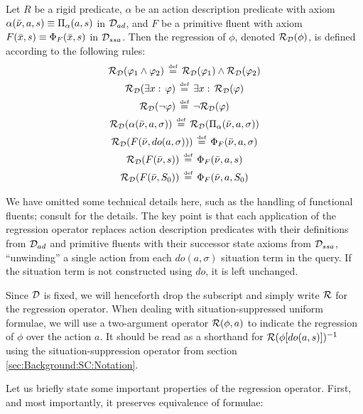 \begin{defnL}
 Let $R$ be a rigid predicate, $\alpha$
be an action description predicate with axiom $\alpha(\bar{\nu},a,s)\equiv\Pi_{\alpha}(a,s)$
in $\mathcal{D}_{ad}$, and $F$ be a primitive fluent with axiom $F(\bar{x},s)\equiv\Phi_{F}(\bar{x},s)$
in $\mathcal{D}_{ssa}$. Then the regression of $\phi$, denoted $\mathcal{R}_{\mathcal{D}}(\phi)$,
is defined according to the following rules:\begin{gather*}
\mathcal{R}_{\mathcal{D}}(\varphi_{1}\wedge\varphi_{2})\,\stackrel{\mbox{\tiny def}}{=}\,\mathcal{R}_{\mathcal{D}}(\varphi_{1})\wedge\mathcal{R}_{\mathcal{D}}(\varphi_{2})\\
\mathcal{R}_{\mathcal{D}}(\exists x:\,\varphi)\,\stackrel{\mbox{\tiny def}}{=}\,\exists x:\,\mathcal{R}_{\mathcal{D}}(\varphi)\\
\mathcal{R}_{\mathcal{D}}(\neg\varphi)\,\stackrel{\mbox{\tiny def}}{=}\,\neg\mathcal{R}_{\mathcal{D}}(\varphi)\\
\mathcal{R}_{\mathcal{D}}(\alpha(\bar{\nu},a,\sigma))\,\stackrel{\mbox{\tiny def}}{=}\,\mathcal{R}_{\mathcal{D}}(\Pi_{\alpha}(\bar{\nu},a,\sigma))\\
\mathcal{R}_{\mathcal{D}}(F(\bar{\nu},do(a,\sigma)))\,\stackrel{\mbox{\tiny def}}{=}\,\Phi_{F}(\bar{\nu},a,\sigma)\\
\mathcal{R}_{\mathcal{D}}(F(\bar{\nu},s))\,\stackrel{\mbox{\tiny def}}{=}\,\Phi_{F}(\bar{\nu},a,s)\\
\mathcal{R}_{\mathcal{D}}(F(\bar{\nu},S_{0}))\,\stackrel{\mbox{\tiny def}}{=}\,\Phi_{F}(\bar{\nu},a,S_{0})\end{gather*}

\end{defnL}
We have omitted some technical details here, such as the handling
of functional fluents; consult \citep{pirri99contributions_sitcalc}
for the details. The key point is that each application of the regression
operator replaces action description predicates with their definitions
from $\mathcal{D}_{ad}$ and primitive fluents with their successor state
axioms from $\mathcal{D}_{ssa}$, {}``unwinding'' a single action from each
$do(a,\sigma)$ situation term in the query. If the situation term
is not constructed using $do$, it is left unchanged.

Since $\mathcal{D}$ is fixed, we will henceforth drop the subscript and simply
write $\mathcal{R}$ for the regression operator. When dealing with situation-suppressed
uniform formulae, we will use a two-argument operator $\mathcal{R}(\phi,a)$
to indicate the regression of $\phi$ over the action $a$. It should
be read as a shorthand for $\mathcal{R}(\phi[do(a,s)])^{-1}$ using the situation-suppression
operator from section \ref{sec:Background:SC:Notation}.

Let us briefly state some important properties of the regression operator.
First, and most importantly, it preserves equivalence of formulae:

